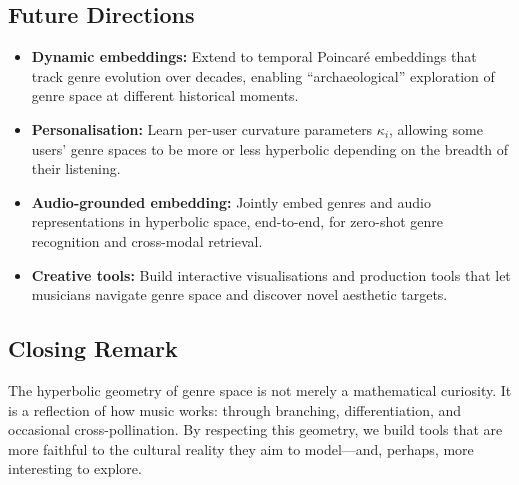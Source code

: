 \documentclass[12pt,a4paper]{article}
\begin{document}
\subsection{Future Directions}

\begin{itemize}
  \item \textbf{Dynamic embeddings:} Extend to temporal Poincar\'e embeddings that track genre evolution over decades, enabling ``archaeological'' exploration of genre space at different historical moments.
  \item \textbf{Personalisation:} Learn per-user curvature parameters $\kappa_i$, allowing some users' genre spaces to be more or less hyperbolic depending on the breadth of their listening.
  \item \textbf{Audio-grounded embedding:} Jointly embed genres and audio representations in hyperbolic space, end-to-end, for zero-shot genre recognition and cross-modal retrieval.
  \item \textbf{Creative tools:} Build interactive visualisations and production tools that let musicians navigate genre space and discover novel aesthetic targets.
\end{itemize}

\subsection{Closing Remark}

The hyperbolic geometry of genre space is not merely a mathematical curiosity. It is a reflection of how music works: through branching, differentiation, and occasional cross-pollination. By respecting this geometry, we build tools that are more faithful to the cultural reality they aim to model---and, perhaps, more interesting to explore.

\end{document}
